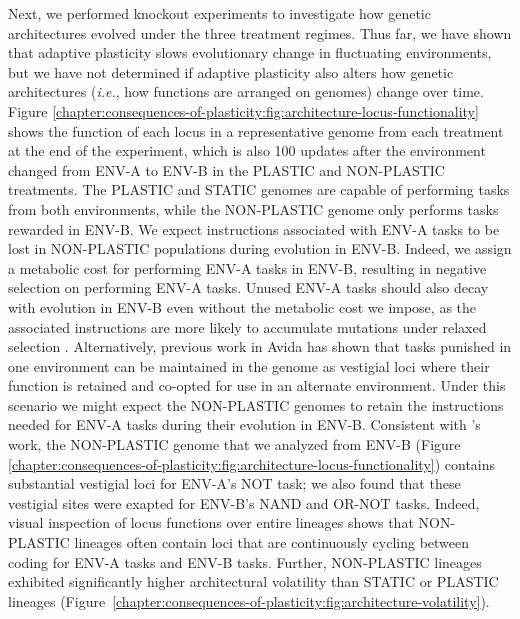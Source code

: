 Next, we performed knockout experiments to investigate how genetic architectures evolved under the three treatment regimes. 
Thus far, we have shown that adaptive plasticity slows evolutionary change in fluctuating environments, 
but we have not determined if adaptive plasticity also alters how genetic architectures (\textit{i.e.}, how functions are arranged on genomes) change over time. 
Figure \ref{chapter:consequences-of-plasticity:fig:architecture-locus-functionality} shows the function of each locus in a representative genome from each treatment at the end of the experiment, which is also 100 updates after the environment changed from ENV-A to ENV-B in the PLASTIC and NON-PLASTIC treatments. 
The PLASTIC and STATIC genomes are capable of performing tasks from both environments, while the NON-PLASTIC genome only performs tasks rewarded in ENV-B.
We expect instructions associated with ENV-A tasks to be lost in NON-PLASTIC populations during evolution in ENV-B. 
Indeed, we assign a metabolic cost for performing ENV-A tasks in ENV-B, resulting in negative selection on performing ENV-A tasks.
Unused ENV-A tasks should also decay with evolution in ENV-B even without the metabolic cost we impose, as the associated instructions are more likely to accumulate mutations under relaxed selection \citep{lahti_relaxed_2009}.  
Alternatively, previous work in Avida has shown that tasks punished in one environment can be maintained in the genome as vestigial loci \citep{canino-koning_evolution_2016,canino-koning_fluctuating_2019} where their function is retained and co-opted for use in an alternate environment. 
Under this scenario we might expect the NON-PLASTIC genomes to retain the instructions needed for ENV-A tasks during their evolution in ENV-B.
Consistent with \cite{canino-koning_evolution_2016,canino-koning_fluctuating_2019}'s work, the NON-PLASTIC genome that we analyzed from ENV-B (Figure \ref{chapter:consequences-of-plasticity:fig:architecture-locus-functionality}) contains substantial vestigial loci for ENV-A's NOT task; we also found that these vestigial sites were exapted for ENV-B's NAND and OR-NOT tasks. 
Indeed, visual inspection of locus functions over entire lineages shows that NON-PLASTIC lineages often contain loci that are continuously cycling between coding for ENV-A tasks and ENV-B tasks.
Further, NON-PLASTIC lineages exhibited significantly higher architectural volatility than STATIC or PLASTIC lineages (Figure~\ref{chapter:consequences-of-plasticity:fig:architecture-volatility}).

